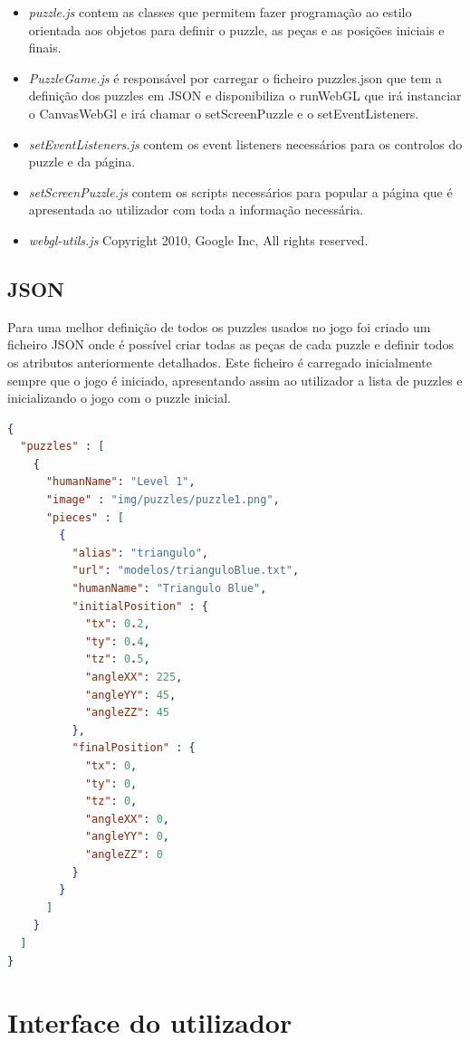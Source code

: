 \documentclass[pdftex,12pt,a4paper]{report}
\begin{document}
\begin{itemize}
        \item \textit{puzzle.js} contem as classes que permitem fazer programação ao estilo orientada aos objetos para definir o puzzle, as peças e as posições iniciais e finais.
        \item \textit{PuzzleGame.js} é responsável por carregar o ficheiro puzzles.json que tem a definição dos puzzles em JSON e disponibiliza o runWebGL que irá instanciar o CanvasWebGl e irá chamar o setScreenPuzzle e o setEventListeners.
	\item \textit{setEventListeners.js} contem os event listeners necessários para os controlos do puzzle e da página.
	\item \textit{setScreenPuzzle.js} contem os scripts necessários para popular a página que é apresentada ao utilizador com toda a informação necessária.
	\item \textit{webgl-utils.js} Copyright 2010, Google Inc, All rights reserved.
	                    
\end{itemize}

\subsection{JSON}

Para uma melhor definição de todos os puzzles usados no jogo foi criado um ficheiro JSON onde é possível criar todas as peças de cada puzzle e definir todos os atributos anteriormente detalhados. Este ficheiro é carregado inicialmente sempre que o jogo é iniciado, apresentando assim ao utilizador a lista de puzzles e inicializando o jogo com o puzzle inicial.

\begin{lstlisting}[language=json,firstnumber=1]
{
  "puzzles" : [
    {
      "humanName": "Level 1",
      "image" : "img/puzzles/puzzle1.png",
      "pieces" : [
        {
          "alias": "triangulo",
          "url": "modelos/trianguloBlue.txt",
          "humanName": "Triangulo Blue",
          "initialPosition" : {
            "tx": 0.2,
            "ty": 0.4,
            "tz": 0.5,
            "angleXX": 225,
            "angleYY": 45,
            "angleZZ": 45
          },
          "finalPosition" : {
            "tx": 0,
            "ty": 0,
            "tz": 0,
            "angleXX": 0,
            "angleYY": 0,
            "angleZZ": 0
          }
        }
      ]
    }
  ]
}
\end{lstlisting}

\section{Interface do utilizador}
\end{document}
